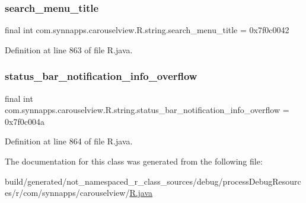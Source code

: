 \subsubsection{\texorpdfstring{search\_menu\_title}{search\_menu\_title}}
{\footnotesize\ttfamily final int com.\+synnapps.\+carouselview.\+R.\+string.\+search\+\_\+menu\+\_\+title = 0x7f0c0042\hspace{0.3cm}{\ttfamily [static]}}



Definition at line 863 of file R.\+java.

\mbox{\label{classcom_1_1synnapps_1_1carouselview_1_1_r_1_1string_ad6cc2b4f545e49faec2778f35174e913}} 
\subsubsection{\texorpdfstring{status\_bar\_notification\_info\_overflow}{status\_bar\_notification\_info\_overflow}}
{\footnotesize\ttfamily final int com.\+synnapps.\+carouselview.\+R.\+string.\+status\+\_\+bar\+\_\+notification\+\_\+info\+\_\+overflow = 0x7f0c004a\hspace{0.3cm}{\ttfamily [static]}}



Definition at line 864 of file R.\+java.



The documentation for this class was generated from the following file\+:\begin{DoxyCompactItemize}
\item 
build/generated/not\+\_\+namespaced\+\_\+r\+\_\+class\+\_\+sources/debug/process\+Debug\+Resources/r/com/synnapps/carouselview/\mbox{\hyperlink{com_2synnapps_2carouselview_2_r_8java}{R.\+java}}\end{DoxyCompactItemize}
